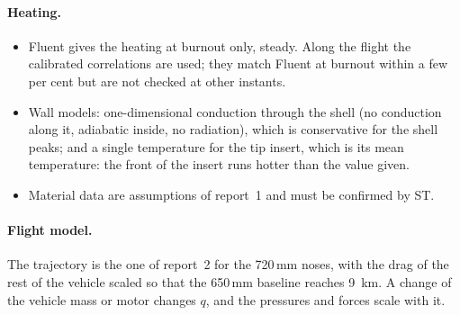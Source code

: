 \paragraph{Heating.}
\begin{itemize}
\item Fluent gives the heating at burnout only, steady. Along the flight the calibrated correlations are
used; they match Fluent at burnout within a few per cent but are not checked at other instants.
\item Wall models: one-dimensional conduction through the shell (no conduction along it, adiabatic
inside, no radiation), which is conservative for the shell peaks; and a single temperature for the tip
insert, which is its mean temperature: the front of the insert runs hotter than the value given.
\item Material data are assumptions of report~1 and must be confirmed by ST.
\end{itemize}

\paragraph{Flight model.} The trajectory is the one of report~2 for the 720\,mm noses, with the drag of
the rest of the vehicle scaled so that the 650\,mm baseline reaches \SI{9}{km}. A change of the
vehicle mass or motor changes $q$, and the pressures and forces scale with it.
